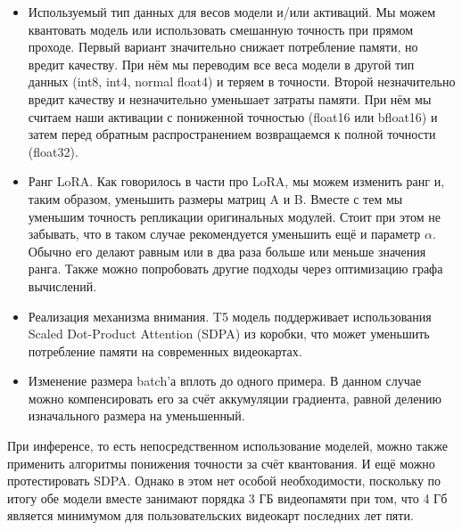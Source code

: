 \begin{itemize}
  \item Используемый тип данных для весов модели и/или активаций.
  Мы можем квантовать модель\cite{lin2024awq} или использовать смешанную точность при прямом проходе\cite{micikevicius2017mixed}.
  Первый вариант значительно снижает потребление памяти, но вредит качеству.
  При нём мы переводим все веса модели в другой тип данных (int8, int4, normal float4) и теряем в точности.
  Второй незначительно вредит качеству и незначительно уменьшает затраты памяти.
  При нём мы считаем наши активации с пониженной точностью (float16 или bfloat16\cite{kalamkar2019study}) и затем перед обратным распространением возвращаемся к полной точности (float32).
  \item Ранг LoRA.
  Как говорилось в части про LoRA, мы можем изменить ранг и, таким образом, уменьшить размеры матриц A и B.
  Вместе с тем мы уменьшим точность репликации оригинальных модулей.
  Стоит при этом не забывать, что в таком случае рекомендуется уменьшить ещё и параметр $\alpha$.
  Обычно его делают равным или в два раза больше или меньше значения ранга.
  Также можно попробовать другие подходы через оптимизацию графа вычислений\cite{cherniuk2023run}.
  \item Реализация механизма внимания.
  T5 модель поддерживает использования Scaled Dot-Product Attention (SDPA)\cite{dao2022flashattention,dao2023flashattention} из коробки, что может уменьшить потребление памяти на современных видеокартах.
  \item Изменение размера batch'а вплоть до одного примера.
  В данном случае можно компенсировать его за счёт аккумуляции градиента, равной делению изначального размера на уменьшенный.
\end{itemize}

При инференсе, то есть непосредственном использование моделей, можно также применить алгоритмы понижения точности за счёт квантования.
И ещё можно протестировать SDPA.
Однако в этом нет особой необходимости, поскольку по итогу обе модели вместе занимают порядка 3 ГБ видеопамяти при том, что 4 Гб является минимумом для пользовательских видеокарт последних лет пяти.

